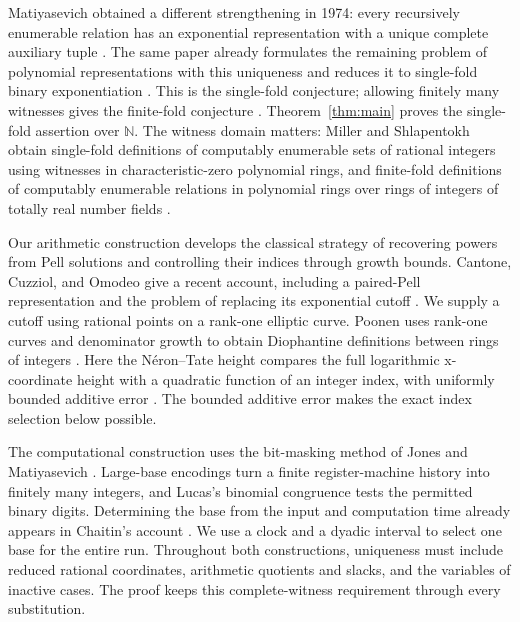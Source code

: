 \documentclass[11pt]{article}
\theoremstyle{definition}
\theoremstyle{remark}
\newcommand{\NN}{\mathbb N}
\begin{document}
Matiyasevich obtained a different strengthening in 1974: every recursively
enumerable relation has an exponential representation with a unique complete
auxiliary tuple \cite[Section~2, Main Theorem]{mati1974}. The same paper
already formulates the remaining problem of polynomial representations with
this uniqueness and reduces it to single-fold binary exponentiation
\cite[Section~1]{mati1974}. This is the single-fold conjecture; allowing
finitely many witnesses gives the finite-fold conjecture \cite{mati2010}.
Theorem~\ref{thm:main} proves the single-fold assertion over $\NN$.
The witness domain matters: Miller and Shlapentokh obtain single-fold
definitions of computably enumerable sets of rational integers using
witnesses in characteristic-zero polynomial rings, and finite-fold definitions
of computably enumerable relations in polynomial rings over rings of
integers of totally real number fields \cite{millershlapentokh2022}.

Our arithmetic construction develops the classical strategy of recovering
powers from Pell solutions and controlling their indices through growth
bounds. Cantone, Cuzziol, and Omodeo give a recent account, including a
paired-Pell representation and the problem of replacing its exponential
cutoff \cite[Section~6, Lemma~6.1 and Theorem~5; Section~7]{cco2024}.
We supply a cutoff using rational points on a rank-one elliptic curve.
Poonen uses rank-one curves and denominator growth to obtain Diophantine
definitions between rings of integers
\cite[Theorem~1 and Section~2.3, Lemma~8]{poonen2002}.
Here the N\'eron--Tate height compares the full logarithmic x-coordinate
height with a quadratic function of an integer index, with uniformly bounded
additive error \cite[Chapter~VIII, Proposition~9.1 and Theorem~9.3]{silverman}.
The bounded additive error makes the exact index selection below possible.

The computational construction uses the bit-masking method of Jones and
Matiyasevich \cite{jm1984,jm1991}. Large-base encodings turn a finite
register-machine history into finitely many integers, and Lucas's binomial
congruence tests the permitted binary digits. Determining the base from the
input and computation time already appears in Chaitin's account
\cite[Sections~2.3 and~2.6]{chaitin1987}. We use a clock and a dyadic
interval to select one base for the entire run. Throughout both constructions,
uniqueness must include reduced rational coordinates, arithmetic quotients
and slacks, and the variables of inactive cases. The proof keeps this
complete-witness requirement through every substitution.
\end{document}
